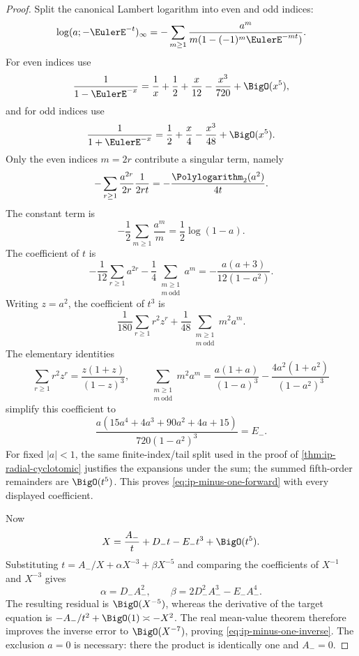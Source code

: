 \begin{proof}
Split the canonical Lambert logarithm into even and odd indices:
\[
 \log(a;-\EulerE^{-t})_\infty
 =-\sum_{m\geq1}\frac{a^m}{m(1-(-1)^m\EulerE^{-mt})}.
\]
For even indices use
\[
 \frac1{1-\EulerE^{-x}}
 =\frac1x+\frac12+\frac{x}{12}-\frac{x^3}{720}
 +\BigO(x^5),
\]
and for odd indices use
\[
 \frac1{1+\EulerE^{-x}}
 =\frac12+\frac{x}{4}-\frac{x^3}{48}+\BigO(x^5).
\]
Only the even indices \(m=2r\) contribute a singular term, namely
\[
 -\sum_{r\geq1}\frac{a^{2r}}{2r}\frac1{2rt}
 =-\frac{\Polylogarithm_2(a^2)}{4t}.
\]
The constant term is
\[
 -\frac12\sum_{m\geq1}\frac{a^m}{m}
 =\frac12\log(1-a).
\]
The coefficient of \(t\) is
\[
 -\frac1{12}\sum_{r\geq1}a^{2r}
 -\frac14\sum_{\substack{m\geq1\\m\ \mathrm{odd}}}a^m
 =-\frac{a(a+3)}{12(1-a^2)}.
\]
Writing \(z=a^2\), the coefficient of \(t^3\) is
\[
 \frac1{180}\sum_{r\geq1}r^2z^r
 +\frac1{48}\sum_{\substack{m\geq1\\m\ \mathrm{odd}}}m^2a^m.
\]
The elementary identities
\[
 \sum_{r\geq1}r^2z^r=\frac{z(1+z)}{(1-z)^3},
 \qquad
 \sum_{\substack{m\geq1\\m\ \mathrm{odd}}}m^2a^m
 =\frac{a(1+a)}{(1-a)^3}
 -\frac{4a^2(1+a^2)}{(1-a^2)^3}
\]
simplify this coefficient to
\[
 \frac{a(15a^4+4a^3+90a^2+4a+15)}{720(1-a^2)^3}=E_-.
\]
For fixed \(|a|<1\), the same finite-index/tail split used in the proof of
\cref{thm:ip-radial-cyclotomic} justifies the expansions under the sum; the
summed fifth-order remainders are \(\BigO(t^5)\).  This proves
\cref{eq:ip-minus-one-forward} with every displayed coefficient.

Now
\[
 X=\frac{A_-}{t}+D_-t-E_-t^3+\BigO(t^5).
\]
Substituting
\(t=A_-/X+\alpha X^{-3}+\beta X^{-5}\) and comparing the coefficients of
\(X^{-1}\) and \(X^{-3}\) gives
\[
 \alpha=D_-A_-^2,
 \qquad
 \beta=2D_-^2A_-^3-E_-A_-^4.
\]
The resulting residual is \(\BigO(X^{-5})\), whereas the derivative of the
target equation is
\(-A_-/t^2+\BigO(1)\asymp-X^2\).  The real mean-value theorem therefore
improves the inverse error to \(\BigO(X^{-7})\), proving
\cref{eq:ip-minus-one-inverse}.  The exclusion \(a=0\) is necessary: there
the product is identically one and \(A_-=0\).
\end{proof}

